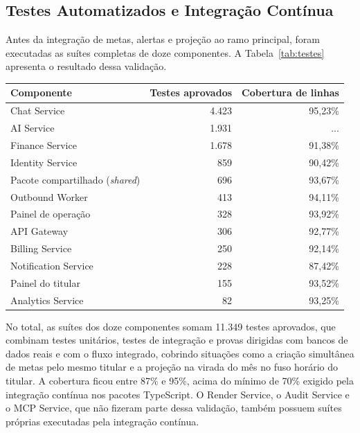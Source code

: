 \subsection{Testes Automatizados e Integração Contínua}

Antes da integração de metas, alertas e projeção ao ramo principal, foram executadas as suítes completas de doze componentes. A Tabela~\ref{tab:testes} apresenta o resultado dessa validação.

\begin{tabela}[H]
\centering
\caption{Testes automatizados por componente na validação de integração}
\label{tab:testes}
\begin{tabular}{lrr}
\toprule
\textbf{Componente} & \textbf{Testes aprovados} & \textbf{Cobertura de linhas} \\
\midrule
Chat Service & 4.423 & 95,23\% \\
AI Service & 1.931 & ... \\
Finance Service & 1.678 & 91,38\% \\
Identity Service & 859 & 90,42\% \\
Pacote compartilhado (\textit{shared}) & 696 & 93,67\% \\
Outbound Worker & 413 & 94,11\% \\
Painel de operação & 328 & 93,92\% \\
API Gateway & 306 & 92,77\% \\
Billing Service & 250 & 92,14\% \\
Notification Service & 228 & 87,42\% \\
Painel do titular & 155 & 93,52\% \\
Analytics Service & 82 & 93,25\% \\
\bottomrule
\end{tabular}
\authorssource
\end{tabela}

No total, as suítes dos doze componentes somam 11.349 testes aprovados, que combinam testes unitários, testes de integração e provas dirigidas com bancos de dados reais e com o fluxo integrado, cobrindo situações como a criação simultânea de metas pelo mesmo titular e a projeção na virada do mês no fuso horário do titular. A cobertura ficou entre 87\% e 95\%, acima do mínimo de 70\% exigido pela integração contínua nos pacotes TypeScript. O Render Service, o Audit Service e o MCP Service, que não fizeram parte dessa validação, também possuem suítes próprias executadas pela integração contínua.

